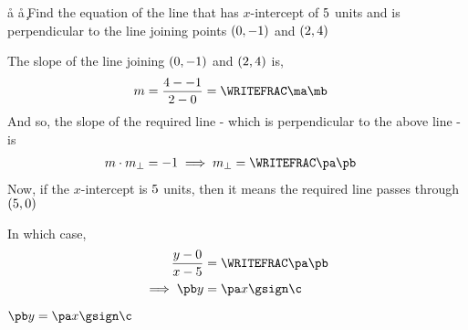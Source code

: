 

\printrubric


\SUBTRACT\vd\vb\aa
\SUBTRACT\vc\va\ab
\FRACTIONSIMPLIFY\aa\ab\ma\mb
{}\ma\mb\pa\pb
\MULTIPLY{-\ve}\pa\c

\question[4] Find the equation of the line that has $x$-intercept of $5$ units and is perpendicular
to the line joining points $(0, -1)$ and $(2, 4)$

\watchout

\begin{solution}[\halfpage]
	The slope of the line joining $(0, -1)$ and $(2, 4)$ is,
	\begin{align}
		m &= \dfrac{\vd-\vb}{\vc-\va} = \WRITEFRAC\ma\mb
	\end{align}
	And so, the slope of the required line - which is perpendicular to the above line - is 
	\begin{align}
		m\cdot m_{\perp} &= -1 \implies m_{\perp} = \WRITEFRAC\pa\pb
	\end{align}
  Now, if the $x$-intercept is $5$ units, then it means the required line passes through $(5,0)$

  In which case,
  \begin{align}
    \dfrac{y - 0}{x - \ve} &= \WRITEFRAC\pa\pb \\
    \implies \pb y &= \pa x \gsign\c
  \end{align}
\end{solution}

\ifprintanswers
  \begin{codex}
    $\pb y = \pa x \gsign\c$
  \end{codex}
\fi

